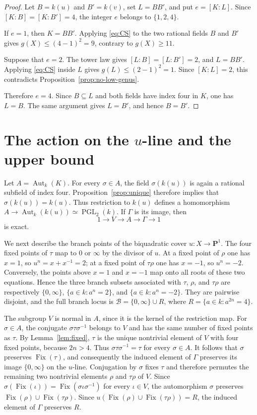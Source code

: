 \documentclass[11pt,reqno]{amsart}
\theoremstyle{remark}
\newcommand{\Aut}{\operatorname{Aut}}
\newcommand{\Fix}{\operatorname{Fix}}
\newcommand{\PGL}{\operatorname{PGL}}
\newcommand{\PP}{\mathbf{P}}
\begin{document}
\begin{proof}
Let $B=k(u)$ and $B'=k(v)$, set $L=BB'$, and put $e=[K:L]$. Since $[K:B]=[K:B']=4$, the integer $e$ belongs to $\{1,2,4\}$.

If $e=1$, then $K=BB'$. Applying \eqref{eq:CS} to the two rational fields $B$ and $B'$ gives $g(X)\leq(4-1)^2=9$, contrary to $g(X)\geq11$.

Suppose that $e=2$. The tower law gives $[L:B]=[L:B']=2$, and $L=BB'$. Applying \eqref{eq:CS} inside $L$ gives $g(L)\leq(2-1)^2=1$. Since $[K:L]=2$, this contradicts Proposition~\ref{prop:no-low-genus}.

Therefore $e=4$. Since $B\subseteq L$ and both fields have index four in $K$, one has $L=B$. The same argument gives $L=B'$, and hence $B=B'$.
\end{proof}

\section{The action on the \texorpdfstring{$u$}{u}-line and the upper bound}

Let $A=\Aut_k(K)$. For every $\sigma\in A$, the field $\sigma(k(u))$ is again a rational subfield of index four. Proposition~\ref{prop:unique} therefore implies that $\sigma(k(u))=k(u)$. Thus restriction to $k(u)$ defines a homomorphism $A\to\Aut_k(k(u))\simeq\PGL_2(k)$. If $\Gamma$ is its image, then
\begin{equation*}
1\longrightarrow V\longrightarrow A\longrightarrow\Gamma\longrightarrow1
\end{equation*}
is exact.

We next describe the branch points of the biquadratic cover
$u:X\to\PP^1$. The four fixed points of $\tau$ map to $0$ or $\infty$
by the divisor of $u$. At a fixed point of $\rho$ one has $x=1$, so
$u^n=x+x^{-1}=2$; at a fixed point of $\tau\rho$ one has $x=-1$, so
$u^n=-2$. Conversely, the points above $x=1$ and $x=-1$ map onto all
roots of these two equations. Hence the three branch subsets associated
with $\tau$, $\rho$, and $\tau\rho$ are respectively $\{0,\infty\}$,
$\{a\in k:a^n=2\}$, and $\{a\in k:a^n=-2\}$. They are pairwise
disjoint, and the full branch locus is $\mathcal{B}=\{0,\infty\}\cup R$,
where $R=\{a\in k:a^{2n}=4\}$.

The subgroup $V$ is normal in $A$, since it is the kernel of the restriction map. For $\sigma\in A$, the conjugate $\sigma\tau\sigma^{-1}$ belongs to $V$ and has the same number of fixed points as $\tau$. By Lemma~\ref{lem:fixed}, $\tau$ is the unique nontrivial element of $V$ with four fixed points, because $2n>4$. Thus $\sigma\tau\sigma^{-1}=\tau$ for every $\sigma\in A$. It follows that $\sigma$ preserves $\Fix(\tau)$, and consequently the induced element of $\Gamma$ preserves its image $\{0,\infty\}$ on the $u$-line. Conjugation by $\sigma$ fixes $\tau$ and therefore permutes the remaining two nontrivial elements $\rho$ and $\tau\rho$ of $V$. Since $\sigma(\Fix(\iota))=\Fix(\sigma\iota\sigma^{-1})$ for every $\iota\in V$, the automorphism $\sigma$ preserves $\Fix(\rho)\cup\Fix(\tau\rho)$. Since $u(\Fix(\rho)\cup\Fix(\tau\rho))=R$, the induced element of $\Gamma$ preserves $R$.
\end{document}
